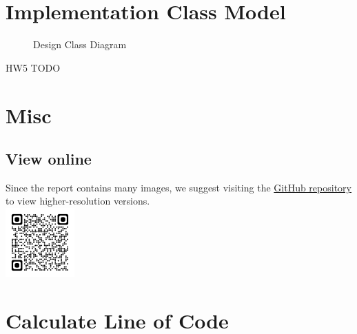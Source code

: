 \documentclass[12pt]{article}
\begin{document}



    \section{Implementation Class Model}
    \begin{figure}[H]
        \centering
        
        \caption{Design Class Diagram}
    \end{figure}
    HW5 TODO
    \newpage


    \section{Misc}

    \subsection{View online}
    Since the report contains many images, we suggest visiting the \href{https://github.com/CSIEHaTerX/Dr.UML/}{GitHub repository} to view higher-resolution versions.\\
    \includegraphics[]{assets/repoQRCode.png}


    \section{Calculate Line of Code}
\end{document}
